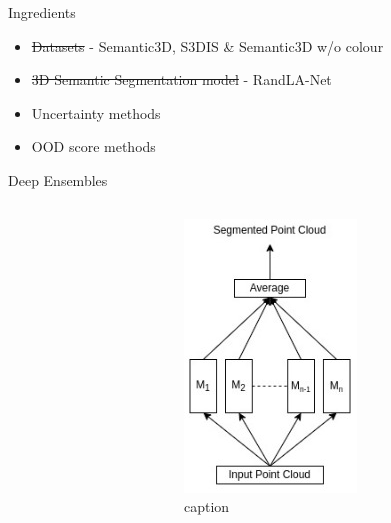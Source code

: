 \documentclass[aspectratio=169]{beamer}
\begin{document}
\begin{frame}{Ingredients}
    \begin{itemize}
        \item \st{Datasets} - Semantic3D, S3DIS \& Semantic3D w/o colour
        \item \st{3D Semantic Segmentation model} - RandLA-Net
        \item Uncertainty methods
        \item OOD score methods
    \end{itemize}
\end{frame}
\begin{frame}{Deep Ensembles}
    \begin{columns}
        \begin{column}{0.5\textwidth}
            
        \end{column}
        \begin{column}{0.5\textwidth}
            \begin{figure}
                \centering
                \includegraphics[scale=0.5]{images/deep_ensembles.jpg}
                \caption{caption}
                \label{fig:deep_ensembles_work}    
            \end{figure}
        \end{column}
    \end{columns}
\end{frame}
\end{document}
